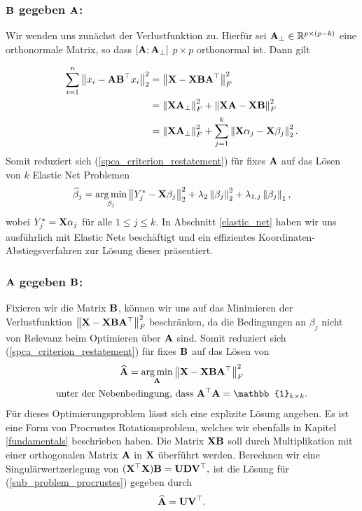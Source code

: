 \subsubsection{$\mathbf{B}$ gegeben $\mathbf{A}$:}

Wir wenden uns zunächst der Verlustfunktion zu. Hierfür sei $\mathbf{A}_{\perp} \in \mathbb{R}^{p \times (p-k)}$ eine orthonormale Matrix, so dass $[\mathbf{A} ; \mathbf{A}_{\perp}]$ $p \times p$ orthonormal ist. Dann gilt

\begin{align*}
\sum_{i=1}^{n} \left\lVert x_i - \mathbf{A}\mathbf{B}^{\top}x_i \right\rVert_2^2 & = \left\lVert \mathbf{X} - \mathbf{X} \mathbf{B} \mathbf{A}^{\top} \right\rVert_F^{2}\\
& = \left\lVert \mathbf{X} \mathbf{A}_{\perp} \right\rVert_F^2 + \left\lVert \mathbf{X} \mathbf{A} - \mathbf{X} \mathbf{B} \right\rVert_F^2\\
& = \left\lVert \mathbf{X} \mathbf{A}_{\perp} \right\rVert_F^2 + \sum_{j=1}^{k}\left\lVert \mathbf{X} \alpha_j - \mathbf{X}\beta_j \right\rVert_2^2.
\end{align*}
Somit reduziert sich (\ref{spca_criterion_restatement}) für fixes $\mathbf{A}$ auf das Lösen von $k$ Elastic Net Problemen
\begin{align}
\label{sub_problem_enet}
\widehat{\beta}_j = \operatorname*{arg\,min}_{\beta_j} \left\lVert Y_j^* - \mathbf{X} \beta_j \right\rVert_2^2 + \lambda_2 \left\lVert \beta_j \right\rVert_2^2 + \lambda_{1,j}\left\lVert \beta_j \right\rVert_1,
\end{align}
wobei $Y_j^* = \mathbf{X} \alpha_j$ für alle $1 \leq j \leq k$. In Abschnitt \ref{elastic_net} haben wir uns ausführlich mit Elastic Nets beschäftigt und ein effizientes Koordinaten-Abstiegsverfahren zur Lösung dieser präsentiert.

\subsubsection{$\mathbf{A}$ gegeben $\mathbf{B}$:}

Fixieren wir die Matrix $\mathbf{B}$, können wir uns auf das Minimieren der Verlustfunktion $\left\lVert \mathbf{X} - \mathbf{X} \mathbf{B} \mathbf{A}^{\top} \right\rVert_F^{2}$ beschränken, da die Bedingungen an $\beta_j$ nicht von Relevanz beim Optimieren über $\mathbf{A}$ sind. Somit reduziert sich (\ref{spca_criterion_restatement}) für fixes $\mathbf{B}$ auf das Lösen von
\begin{align}
\label{sub_problem_procrustes}
\begin{gathered}
\widehat{\mat A} = \argmin_{\mat A}\norm{\mat X - \mat X \mat B \mat A^{\top}}_F^2\\
\text{unter der Nebenbedingung, dass } \mat A^{\top} \mat A = \mat{\mathbb{1}}_{k \times k}.
\end{gathered}
\end{align}
Für dieses Optimierungsproblem lässt sich eine explizite Lösung angeben. Es ist eine Form von Procrustes Rotationsproblem, welches wir ebenfalls in Kapitel \ref{fundamentals} beschrieben haben. Die Matrix $\mathbf{X} \mathbf{B}$ soll durch Multiplikation mit einer orthogonalen Matrix $\mathbf{A}$ in $\mathbf{X}$ überführt werden. Berechnen wir eine Singulärwertzerlegung von $(\mathbf{X}^{\top} \mathbf{X}) \mathbf{B} = \mathbf{U} \mathbf{D} \mathbf{V}^{\top},$ ist die Lösung für (\ref{sub_problem_procrustes}) gegeben durch
\begin{align}
\widehat{\mathbf{A}} = \mathbf{U} \mathbf{V}^{\top}.
\end{align}


